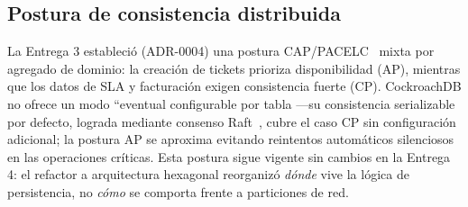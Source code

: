 \subsection{Postura de consistencia distribuida}

La Entrega 3 estableció (ADR-0004) una postura CAP/PACELC~\cite{brewer2012cap,abadi2012consistency}
mixta por agregado de dominio: la creación de tickets prioriza disponibilidad (AP), mientras que
los datos de SLA y facturación exigen consistencia fuerte (CP). CockroachDB no ofrece un modo
``eventual configurable por tabla —su consistencia serializable por defecto, lograda mediante
consenso Raft~\cite{ongaro2014raft}, cubre el caso CP sin configuración adicional; la postura AP
se aproxima evitando reintentos automáticos silenciosos en las operaciones críticas. Esta postura
sigue vigente sin cambios en la Entrega 4: el refactor a arquitectura hexagonal reorganizó
\emph{dónde} vive la lógica de persistencia, no \emph{cómo} se comporta frente a particiones de
red.
